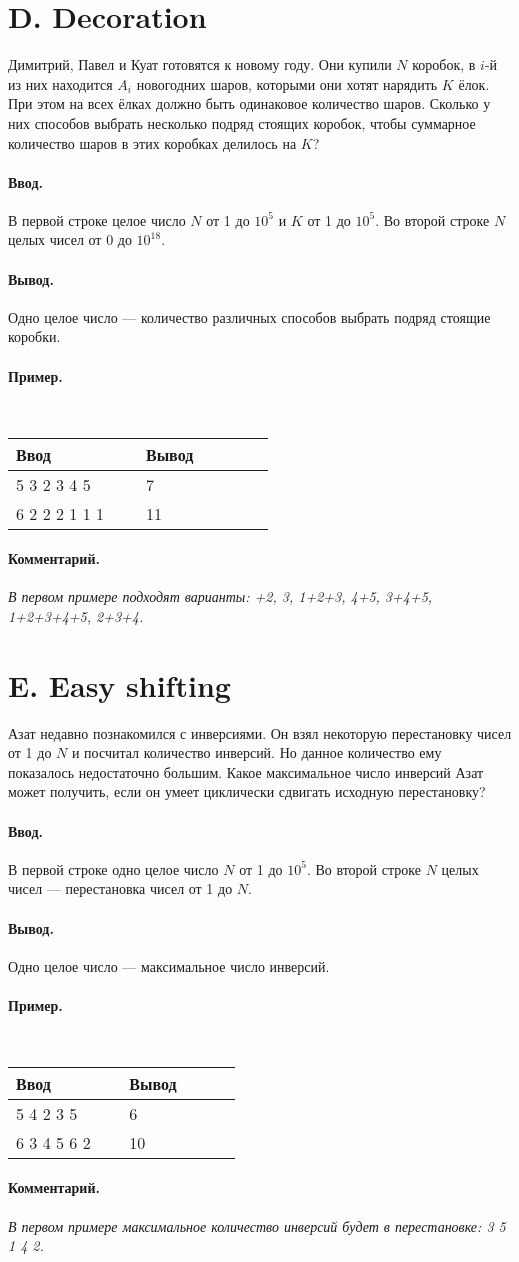 \documentclass[12pt, a5paper]{article}
\newcommand{\informat}[1]
{
	\paragraph{Ввод.\\} #1
}
\newcommand{\outformat}[1]
{
	\paragraph{Вывод.\\} #1
}
\newcommand{\examplee}[4]
{
	\paragraph{Пример.\\}
	{\tt
	\begin{tabular}{|p{0.4\linewidth}|p{0.4\linewidth}|}
	\hline
	Ввод 	& Вывод  	\\
	\hline
	#1 		& #2 		\\
	\hline
	#3		& #4		\\
	\hline
	\end{tabular}
	}
}
\newcommand{\excomm}[1]
{
	\paragraph{Комментарий. \\}
	\textit{#1}
}
\begin{document}
\section*{D. Decoration}


Димитрий, Павел и Куат готовятся к новому году. Они купили $N$ коробок, в $i$-й из них находится $A_i$ новогодних шаров, которыми они хотят нарядить $K$ ёлок. При этом на всех ёлках должно быть одинаковое количество шаров. Сколько у них способов выбрать несколько подряд стоящих коробок, чтобы суммарное количество шаров в этих коробках делилось на $K$?

\informat{В первой строке целое число $N$ от 1 до $10^5$ и $K$ от 1 до $10^5$. \newline
Во второй строке $N$ целых чисел от 0 до $10^{18}$.}

\outformat{Одно целое число --- количество различных способов выбрать подряд стоящие коробки.}

\examplee
{5 3  2 3 4 5}
{7}
{6 2 \newline
2 2 2 1 1 1}
{11}

\excomm{В первом примере подходят варианты: \newline 1+2, 3, 1+2+3, 4+5, 3+4+5, 1+2+3+4+5, 2+3+4.}



\section*{E. Easy shifting}


Азат недавно познакомился с инверсиями. Он взял некоторую перестановку чисел от 1 до $N$ и посчитал количество инверсий. Но данное количество ему показалось недостаточно большим. Какое максимальное число инверсий Азат может получить, если он умеет циклически сдвигать исходную перестановку?

\informat{В первой строке одно целое число $N$ от 1 до $10^5$. \newline 
Во второй строке $N$ целых чисел --- перестановка чисел от 1 до $N$.}

\outformat{Одно целое число --- максимальное число инверсий.}

\examplee
{5 \newline
1 4 2 3 5}
{6}
{6 \newline
1 3 4 5 6 2}
{10}

\excomm{В первом примере максимальное количество инверсий будет в перестановке: 3 5 1 4 2.}
\end{document}
